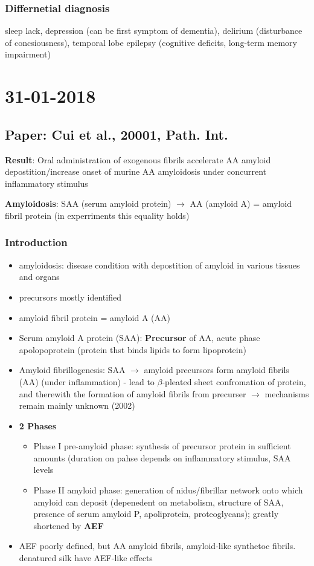 \documentclass[fleqn]{article}\usepackage{caption}
\begin{document}
\subsubsection{Differnetial diagnosis}
sleep lack, depression (can be first symptom of dementia), delirium (disturbance of concsiousness), temporal lobe epilepsy (cognitive deficits, long-term memory impairment)


\section{31-01-2018}
\subsection{Paper: Cui et al., 20001,  Path. Int.}
\textbf{Result}: Oral administration of exogenous fibrils accelerate AA amyloid depostition/increase onset of murine AA amyloidosis under concurrent inflammatory stimulus

\textbf{Amyloidosis}: SAA (serum amyloid protein) $\rightarrow$ AA (amyloid A) = amyloid fibril protein (in experriments this equality holds)
\subsubsection{Introduction}
\begin{itemize}
\item amyloidosis: disease condition with depostition of amyloid in various tissues and organs
\item precursors mostly identified
\item amyloid fibril protein = amyloid A (AA) 
\item Serum amyloid A protein (SAA):  \textbf{Precursor}  of AA, acute phase apolopoprotein (protein thst binds lipids to form lipoprotein)
\item Amyloid fibrillogenesis: SAA $\rightarrow$ amyloid
precursors form amyloid fibrils (AA) (under inflammation) - lead to $\beta$-pleated sheet confromation of protein, and therewith the formation of amyloid fibrils from precurser $\rightarrow$ mechanisms remain mainly unknown (2002)

 
\item \textbf{2 Phases}
\begin{itemize}
\item Phase I pre-amyloid phase: synthesis of precursor protein in sufficient amounts (duration on pahse depends on inflammatory stimulus, SAA levels
\item Phase II amyloid phase: generation of nidus/fibrillar network onto which amyloid can deposit (depenedent on metabolism, structure of SAA, presence of serum amyloid P, apoliprotein, proteoglycans); greatly shortened by \textbf{AEF}
\end{itemize}
\item AEF poorly defined, but AA amyloid fibrils, amyloid-like synthetoc fibrils. denatured silk have AEF-like effects
\end{itemize}
\end{document}
